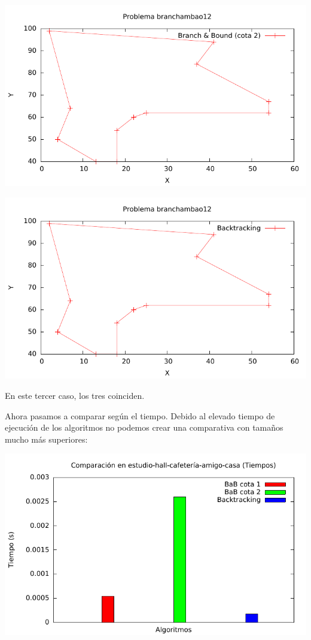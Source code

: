 \includegraphics[width=15cm]{img/branchambao12_tsp_2}

\includegraphics[width=15cm]{img/branchambao12_tsp_3}

En este tercer caso, los tres coinciden.

Ahora pasamos a comparar según el tiempo. Debido al elevado tiempo de ejecución de los algoritmos no podemos crear una comparativa con tamaños mucho más superiores:

\includegraphics[width=15cm]{img/barras_e-h-c-a-c5_t}


